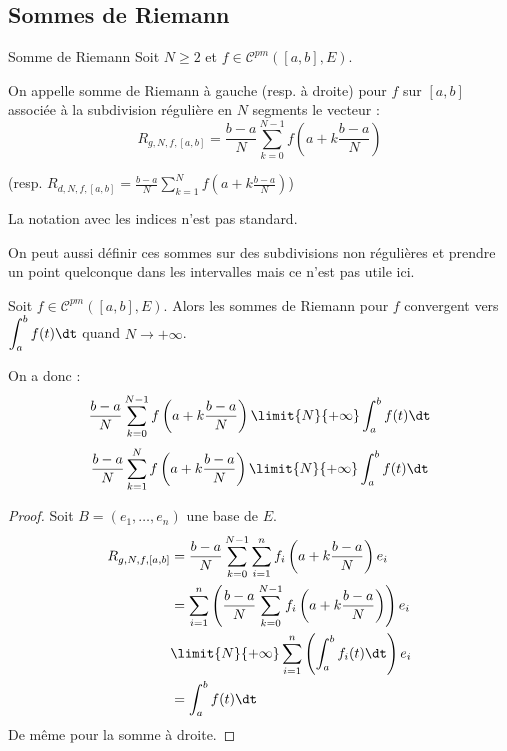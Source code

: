\subsection{Sommes de Riemann}

\begin{definition}{Somme de Riemann}{}
    Soit $N \geqslant 2$ et $f \in \mathscr C^{pm}([a, b], E)$.

    On appelle somme de Riemann à gauche (resp. à droite) pour $f$ sur $[a, b]$ associée à la 
    subdivision régulière en $N$ segments le vecteur :
    \[R_{g, N, f, [a, b]} = \frac{b-a} N \sum_{k=0}^{N-1} f\left( a + k \frac{b-a}{N} \right)\]

    (resp. $\displaystyle R_{d, N, f, [a, b]} = \frac{b-a} N \sum_{k=1}^{N} f\left( a + k \frac{b-a}{N} \right)$)
\end{definition}

\begin{remarque}
    La notation avec les indices n'est pas standard.
    
    On peut aussi définir ces sommes sur des subdivisions non régulières et prendre un point quelconque dans les intervalles mais ce n'est pas utile ici.
\end{remarque}

\begin{proposition}{}{}
    Soit $f \in \mathscr C^{pm}([a, b], E)$. Alors les sommes de Riemann pour $f$ convergent vers 
    $\displaystyle \int_a^b f(t) \dt$ quand $N \to +\infty$.

    On a donc :
    \[\frac{b - a }{N } \sum_{k = 0 }^{N - 1 } f\left( a + k \frac{b - a } N \right) \limit{N}{+ \infty} \int_a^b f(t) \dt\]
    \[\frac{b - a }{N } \sum_{k = 1 }^{N} f\left( a + k \frac{b - a } N \right) \limit{N}{+ \infty} \int_a^b f(t) \dt\]
\end{proposition}


\begin{proof}
Soit $B= (e_1,\dots,e_n)$ une base de $E$.
    \begin{align*}
        R_{g, N, f, [a, b]} & = \frac{b - a }{N } \sum_{k = 0 }^{N - 1 } \sum_{i = 1 }^{n } f_i\left( a + k \frac{b - a } N \right) e_i \\
        & = \sum_{i = 1 }^{n } \left( \frac{b - a }{N } \sum_{k = 0 }^{N - 1 } f_i\left( a + k \frac{b - a } N \right) \right) e_i \\
        & \limit{N}{+ \infty} \sum_{i = 1 }^{n } \left( \int_a^b f_i(t) \dt \right) e_i \\
        & = \int_a^b f(t) \dt
    \end{align*}
De même pour la somme à droite.
\end{proof}

